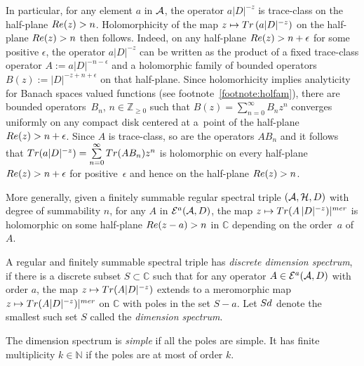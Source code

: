 \documentclass[11pt]{article}
\def \C{\mathbb C}
\def \Z {\mathbb Z}
\def \N {\mathbb N}
\def \e {{\epsilon}}
\numberwithin{equation}{section}
\begin{document}
\begin{remark}  In particular, for any element $ a$ in
${\cal A}$, the operator $a
    \vert D\vert^{-z}$ is trace-class  on the half-plane ${\rm
    Re}(z)>n $. Holomorphicity of the map $z\mapsto {\rm Tr}\left(a
    \vert D\vert^{-z}\right)$ on the half-plane ${\rm
    Re}(z)>n $ then follows. Indeed,  on any half-plane  ${\rm    Re}(z)>n+\e$ for some positive $\e$, the operator   $a   \vert D\vert^{-z}$  can be written  as  the product of a f\/ixed trace-class operator $A:= a \vert D\vert^{-n-\e}$ and a holomorphic family of bounded operators $B(z):=\vert D\vert^{-z+n+\e}$  on that
half-plane.   Since  holomorhicity implies analyticity for  Banach spaces valued functions (see  footnote~\ref{footnote:holfam}), there are bounded operators~$B_n$, $n\in \Z_{\geq 0}$ such that
$B(z)=\sum\limits_{n=0}^\infty B_n z^n$ converges uniformly on any compact disk centered at a~point of the half-plane  ${\rm
    Re}(z)>n+\e$.  Since $A$ is trace-class, so are the operators $AB_n$ and it  follows that ${\rm Tr}(a   \vert D\vert^{-z})= \sum\limits_{n=0}^\infty{\rm Tr}( A  B_n)z^n$ is holomorphic on every half-plane  ${\rm
    Re}(z)>n+\e$ for  positive~$\e$
 and hence on the half-plane  ${\rm
    Re}(z)>n$.
\end{remark}

More generally, given a f\/initely summable regular spectral triple  $\left({\cal A}, {\cal H},
  D\right)$ with degree of summability $n$, for any $A $ in ${\cal E}^a({\cal A}, D)$, the map $z\mapsto {\rm Tr}(A \,\vert D\vert^{-z})\vert^{\rm
  mer}$ is holomorphic on some half-plane ${\rm Re}(z-a)>n$ in  $\C$
depending on the order~$a$ of~$A$.

\begin{definition}
A regular and f\/initely summable spectral triple  has   {\it  discrete dimension
spectrum}, if  there is a discrete subset $S\subset \C$ such that for any
operator $A\in {\cal E}^a({\cal A}, D)$ with order $a$, the  map
 $z\mapsto {\rm Tr}(A  \vert D\vert^{-z})$
extends to a meromorphic map  $z\mapsto
 {\rm Tr}(A  \vert D\vert^{-z})\vert^{\rm
  mer}$ on $\C$
with  poles   in the  set
$S-a$. Let ${\rm Sd}$ denote the smallest such set $S$ called the {\it dimension
spectrum}.

 The dimension spectrum is {\it simple} if all the poles are
simple. It has f\/inite multiplicity  $k\in \N$ if the poles are at most of order $k$.\end{definition}
\end{document}
